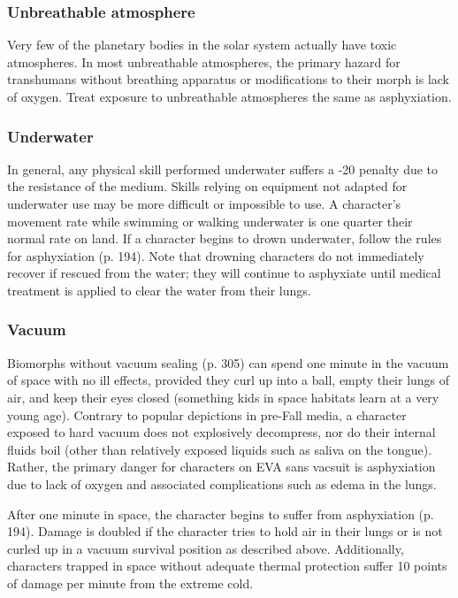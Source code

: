 \subsubsection{Unbreathable atmosphere}

Very few of the planetary bodies in the solar system actually have toxic atmospheres. In most unbreathable atmospheres, the primary hazard for transhumans without breathing apparatus or modifications to their morph is lack of oxygen. Treat exposure to unbreathable atmospheres the same as asphyxiation.

\subsubsection{Underwater}

In general, any physical skill performed underwater suffers a -20 penalty due to the resistance of the medium. Skills relying on equipment not adapted for underwater use may be more difficult or impossible to use. A character’s movement rate while swimming or walking underwater is one quarter their normal rate on land. If a character begins to drown underwater, follow the rules for asphyxiation (p. 194). Note that drowning characters do not immediately recover if rescued from the water; they will continue to asphyxiate until medical treatment is applied to clear the water from their lungs.

\subsubsection{Vacuum}

Biomorphs without vacuum sealing (p. 305) can spend one minute in the vacuum of space with no ill effects, provided they curl up into a ball, empty their lungs of air, and keep their eyes closed (something kids in space habitats learn at a very young age). Contrary to popular depictions in pre-Fall media, a character exposed to hard vacuum does not explosively decompress, nor do their internal fluids boil (other than relatively exposed liquids such as saliva on the tongue). Rather, the primary danger for characters on EVA sans vacsuit is asphyxiation due to lack of oxygen and associated complications such as edema in the lungs.

After one minute in space, the character begins to suffer from asphyxiation (p. 194). Damage is doubled if the character tries to hold air in their lungs or is not curled up in a vacuum survival position as described above. Additionally, characters trapped in space without adequate thermal protection suffer 10 points of damage per minute from the extreme cold.

